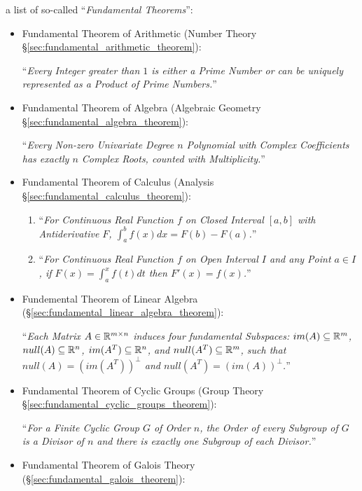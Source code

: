 a list of so-called ``\emph{Fundamental Theorems}'':
\begin{itemize}

  \item Fundamental Theorem of Arithmetic
    (Number Theory \S\ref{sec:fundamental_arithmetic_theorem}):

    ``\emph{Every Integer greater than $1$ is either a Prime Number or can be
      uniquely represented as a Product of Prime Numbers.}''

  \item Fundamental Theorem of Algebra
    (Algebraic Geometry \S\ref{sec:fundamental_algebra_theorem}):

    ``\emph{Every Non-zero Univariate Degree $n$ Polynomial with Complex
    Coefficients has exactly $n$ Complex Roots, counted with Multiplicity.}''

  \item Fundamental Theorem of Calculus
    (Analysis \S\ref{sec:fundamental_calculus_theorem}):

    \begin{enumerate}
      \item ``\emph{For Continuous Real Function $f$ on Closed Interval $[a,b]$
        with Antiderivative $F$, $\int_a^b f(x) dx = F(b) - F(a)$.}''
      \item ``\emph{For Continuous Real Function $f$ on Open Interval $I$
        and any Point $a \in I$, if $F(x) = \int_a^x f(t) dt$ then
        $F'(x) = f(x)$.}''
    \end{enumerate}
  \item Fundemental Theorem of Linear Algebra
    (\S\ref{sec:fundamental_linear_algebra_theorem}):

    ``\emph{Each Matrix $A \in \mathbb{R}^{m \times n}$ induces four fundamental
    Subspaces: $im(A) \subseteq \mathbb{R}^m$, $null(A) \subseteq \mathbb{R}^n$,
    $im(A^T) \subseteq \mathbb{R}^n$, and $null(A^T) \subseteq \mathbb{R}^m$, such that
    $null(A) = (im(A^T))^\bot$ and $null(A^T) = (im(A))^\bot$.}''

  \item Fundamental Theorem of Cyclic Groups
    (Group Theory \S\ref{sec:fundamental_cyclic_groups_theorem}):

    ``\emph{For a Finite Cyclic Group $G$ of Order $n$, the Order of every
    Subgroup of $G$ is a Divisor of $n$ and there is exactly one Subgroup of
    each Divisor.}''

  \item Fundamental Theorem of Galois Theory
    (\S\ref{sec:fundamental_galois_theorem}):


\end{itemize}
